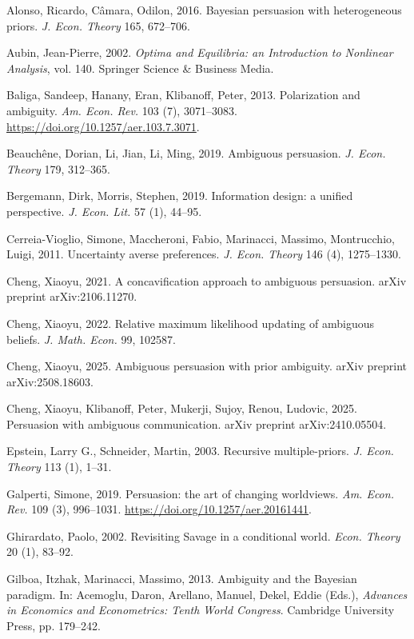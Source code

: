 \documentclass[12pt,a4paper]{article}
\theoremstyle{definition}
\theoremstyle{remark}
\newenvironment{original}{%
    \par\medskip\noindent%
    \begin{tcolorbox}[%
        colback=white,%
        colframe=black!50,%
        title=\textbf{Original English},%
        fonttitle=\small\bfseries,%
        left=0pt, right=0pt, top=2pt, bottom=2pt,%
        boxrule=0.5pt,%
        arc=0pt,%
        outer arc=0pt%
    ]%
    \small%
}{%
    \end{tcolorbox}%
}
\begin{document}
\begin{original}
\noindent Alonso, Ricardo, C\^{a}mara, Odilon, 2016. Bayesian persuasion with heterogeneous priors. \textit{J. Econ. Theory} 165, 672--706.

\noindent Aubin, Jean-Pierre, 2002. \textit{Optima and Equilibria: an Introduction to Nonlinear Analysis}, vol. 140. Springer Science \& Business Media.

\noindent Baliga, Sandeep, Hanany, Eran, Klibanoff, Peter, 2013. Polarization and ambiguity. \textit{Am. Econ. Rev.} 103 (7), 3071--3083. \url{https://doi.org/10.1257/aer.103.7.3071}.

\noindent Beauch\^{e}ne, Dorian, Li, Jian, Li, Ming, 2019. Ambiguous persuasion. \textit{J. Econ. Theory} 179, 312--365.

\noindent Bergemann, Dirk, Morris, Stephen, 2019. Information design: a unified perspective. \textit{J. Econ. Lit.} 57 (1), 44--95.

\noindent Cerreia-Vioglio, Simone, Maccheroni, Fabio, Marinacci, Massimo, Montrucchio, Luigi, 2011. Uncertainty averse preferences. \textit{J. Econ. Theory} 146 (4), 1275--1330.

\noindent Cheng, Xiaoyu, 2021. A concavification approach to ambiguous persuasion. arXiv preprint arXiv:2106.11270.

\noindent Cheng, Xiaoyu, 2022. Relative maximum likelihood updating of ambiguous beliefs. \textit{J. Math. Econ.} 99, 102587.

\noindent Cheng, Xiaoyu, 2025. Ambiguous persuasion with prior ambiguity. arXiv preprint arXiv:2508.18603.

\noindent Cheng, Xiaoyu, Klibanoff, Peter, Mukerji, Sujoy, Renou, Ludovic, 2025. Persuasion with ambiguous communication. arXiv preprint arXiv:2410.05504.

\noindent Epstein, Larry G., Schneider, Martin, 2003. Recursive multiple-priors. \textit{J. Econ. Theory} 113 (1), 1--31.

\noindent Galperti, Simone, 2019. Persuasion: the art of changing worldviews. \textit{Am. Econ. Rev.} 109 (3), 996--1031. \url{https://doi.org/10.1257/aer.20161441}.

\noindent Ghirardato, Paolo, 2002. Revisiting Savage in a conditional world. \textit{Econ. Theory} 20 (1), 83--92.

\noindent Gilboa, Itzhak, Marinacci, Massimo, 2013. Ambiguity and the Bayesian paradigm. In: Acemoglu, Daron, Arellano, Manuel, Dekel, Eddie (Eds.), \textit{Advances in Economics and Econometrics: Tenth World Congress}. Cambridge University Press, pp. 179--242.


\end{original}
\end{document}

